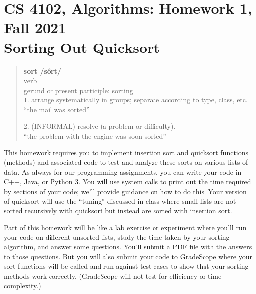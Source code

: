 \documentclass[11pt]{article}
\begin{document}
\section*{CS 4102, Algorithms:  Homework 1, Fall 2021 \\
Sorting Out Quicksort}



\begin{quote}
\textbf{sort  /sôrt/ }\\
verb \\
gerund or present participle: sorting \\
1. arrange systematically in groups; separate according to type, class, etc. \\
``the mail was sorted''

2. (INFORMAL) resolve (a problem or difficulty). \\
``the problem with the engine was soon sorted''
\end{quote}

This homework requires you to implement insertion sort and quicksort functions (methods) and associated code to test and analyze these sorts on various lists of data. As always for our programming assignments, you can write your code in C++, Java, or Python 3. You will use system calls to print out the time required by sections of your code; we'll provide guidance on how to do this.  Your version of quicksort will use the ``tuning'' discussed in class where small lists are not sorted recursively with quicksort but instead are sorted with insertion sort.

Part of this homework will be like a lab exercise or experiment where you'll run your code on different unsorted lists, study the time taken by your sorting algorithm, and answer some questions. You'll submit a PDF file with the answers to those questions.  But you will also submit your code to GradeScope where your sort functions will be called and run against test-cases to show that your sorting methods work correctly. (GradeScope will not test for efficiency or time-complexity.)
\end{document}
